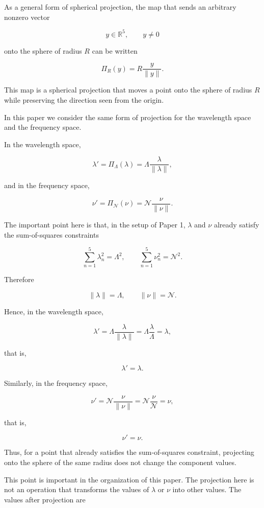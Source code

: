 \documentclass[
]{article}
\begin{document}
As a general form of spherical projection, the map that sends an
arbitrary nonzero vector

\[
y\in\mathbb{R}^5,\qquad y\ne0
\]

onto the sphere of radius \(R\) can be written

\[
\Pi_R(y)=R\frac{y}{\|y\|} .
\]

This map is a spherical projection that moves a point onto the sphere of
radius \(R\) while preserving the direction seen from the origin.

In this paper we consider the same form of projection for the wavelength
space and the frequency space.

In the wavelength space,

\[
\lambda'=\Pi_\Lambda(\lambda)
=
\Lambda\frac{\lambda}{\|\lambda\|} ,
\]

and in the frequency space,

\[
\nu'=\Pi_{\mathcal{N}}(\nu)
=
\mathcal{N}\frac{\nu}{\|\nu\|} .
\]

The important point here is that, in the setup of Paper 1, \(\lambda\)
and \(\nu\) already satisfy the sum-of-squares constraints

\[
\sum_{n=1}^{5}\lambda_n^2=\Lambda^2,
\qquad
\sum_{n=1}^{5}\nu_n^2=\mathcal{N}^2 .
\]

Therefore

\[
\|\lambda\|=\Lambda,
\qquad
\|\nu\|=\mathcal{N} .
\]

Hence, in the wavelength space,

\[
\lambda'
=
\Lambda\frac{\lambda}{\|\lambda\|}
=
\Lambda\frac{\lambda}{\Lambda}
=
\lambda ,
\]

that is,

\[
\boxed{\lambda'=\lambda} .
\]

Similarly, in the frequency space,

\[
\nu'
=
\mathcal{N}\frac{\nu}{\|\nu\|}
=
\mathcal{N}\frac{\nu}{\mathcal{N}}
=
\nu ,
\]

that is,

\[
\boxed{\nu'=\nu} .
\]

Thus, for a point that already satisfies the sum-of-squares constraint,
projecting onto the sphere of the same radius does not change the
component values.

This point is important in the organization of this paper. The
projection here is not an operation that transforms the values of
\(\lambda\) or \(\nu\) into other values. The values after projection
are
\end{document}
